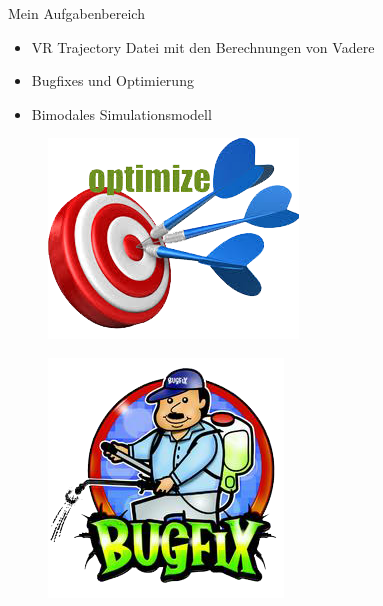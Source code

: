 \begin{frame}{Mein Aufgabenbereich}
	\begin{itemize}
		\item VR Trajectory Datei mit den Berechnungen von Vadere
		\item Bugfixes und Optimierung
		\item Bimodales Simulationsmodell
	\end{itemize}

	\begin{minipage}{0.4\textwidth}
		\begin{figure}
			\includegraphics[width=\textwidth]{appendix/images/caricature/optimize.png}
		\end{figure}
	\end{minipage} \hfill
	\begin{minipage}{0.5\textwidth}
			\begin{figure}[H]
				\includegraphics[width=\textwidth]{appendix/images/caricature/bugfixer.png}

\end{figure}
\end{minipage}
\end{frame}
